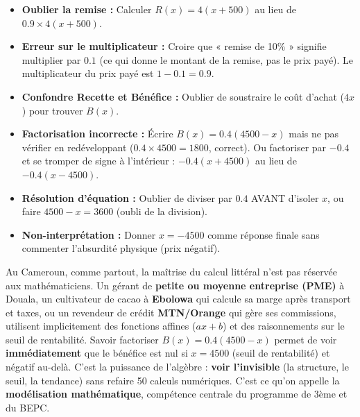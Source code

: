 \documentclass[11pt]{article}
\begin{document}
\begin{attention}
\begin{itemize}
    \item \textbf{Oublier la remise :} Calculer $R(x) = 4(x+500)$ au lieu de $\num{0,9} \times 4(x+500)$.
    \item \textbf{Erreur sur le multiplicateur :} Croire que « remise de 10\% » signifie multiplier par $\num{0,1}$ (ce qui donne le montant de la remise, pas le prix payé). Le multiplicateur du prix payé est $1 - \num{0,1} = \num{0,9}$.
    \item \textbf{Confondre Recette et Bénéfice :} Oublier de soustraire le coût d'achat ($4x$) pour trouver $B(x)$.
    \item \textbf{Factorisation incorrecte :} Écrire $B(x) = \num{0,4}(4500 - x)$ mais ne pas vérifier en redéveloppant ($\num{0,4} \times 4500 = 1800$, correct). Ou factoriser par $-\num{0,4}$ et se tromper de signe à l'intérieur : $-\num{0,4}(x + 4500)$ au lieu de $-\num{0,4}(x - 4500)$.
    \item \textbf{Résolution d'équation :} Oublier de diviser par $\num{0,4}$ AVANT d'isoler $x$, ou faire $4500 - x = 3600$ (oubli de la division).
    \item \textbf{Non-interprétation :} Donner $x = -4500$ comme réponse finale sans commenter l'absurdité physique (prix négatif).
\end{itemize}
\end{attention}

\begin{savaistu}
Au Cameroun, comme partout, la maîtrise du calcul littéral n'est pas réservée aux mathématiciens. Un gérant de \textbf{petite ou moyenne entreprise (PME)} à Douala, un cultivateur de cacao à \textbf{Ebolowa} qui calcule sa marge après transport et taxes, ou un revendeur de crédit \textbf{MTN/Orange} qui gère ses commissions, utilisent implicitement des fonctions affines ($ax+b$) et des raisonnements sur le seuil de rentabilité.
Savoir factoriser $B(x) = \num{0,4}(4500-x)$ permet de voir \textbf{immédiatement} que le bénéfice est nul si $x=4500$ (seuil de rentabilité) et négatif au-delà. C'est la puissance de l'algèbre : \textbf{voir l'invisible} (la structure, le seuil, la tendance) sans refaire 50 calculs numériques. C'est ce qu'on appelle la \textbf{modélisation mathématique}, compétence centrale du programme de 3ème et du BEPC.
\end{savaistu}
\end{document}
